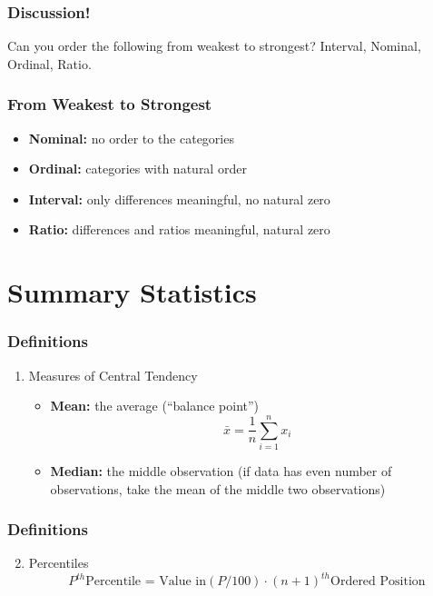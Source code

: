 \documentclass[handout]{beamer}
\begin{document}
\begin{frame}
\frametitle{Discussion!}
	Can you order the following from weakest to strongest? 
	\alert{Interval, Nominal, Ordinal, Ratio.}
\end{frame}

\begin{frame}
\frametitle{From Weakest to Strongest}
	\begin{itemize}[<+->]
		\item \textbf{Nominal:} no order to the categories
		\item \textbf{Ordinal:} categories with natural order
		\item \textbf{Interval:} only differences meaningful, no natural zero
		\item \textbf{Ratio:} differences and ratios meaningful, natural zero
	\end{itemize}
\end{frame}

\section{Summary Statistics}
\begin{frame}
\frametitle{Definitions}
	\begin{enumerate}
		\item Measures of Central Tendency
		\begin{itemize}
			\item \textbf{Mean:} the average (``balance point'')
			$$
			\bar{x} = \frac{1}{n} \sum_{i=1}^n x_i
			$$
			\item \textbf{Median:} the middle observation (if data has even number of 							observations, take the mean of the middle two observations)
		\end{itemize}
	\end{enumerate}
\end{frame}

\begin{frame}
\frametitle{Definitions}
	\begin{enumerate}
	\setcounter{enumi}{1}
		\item Percentiles
		$$
		P^{th} \text{Percentile = Value in}  \left(P/100\right)\cdot (n+1)^{th} \text{Ordered 					Position}
		$$
	\end{enumerate}
\end{frame}
\end{document}
